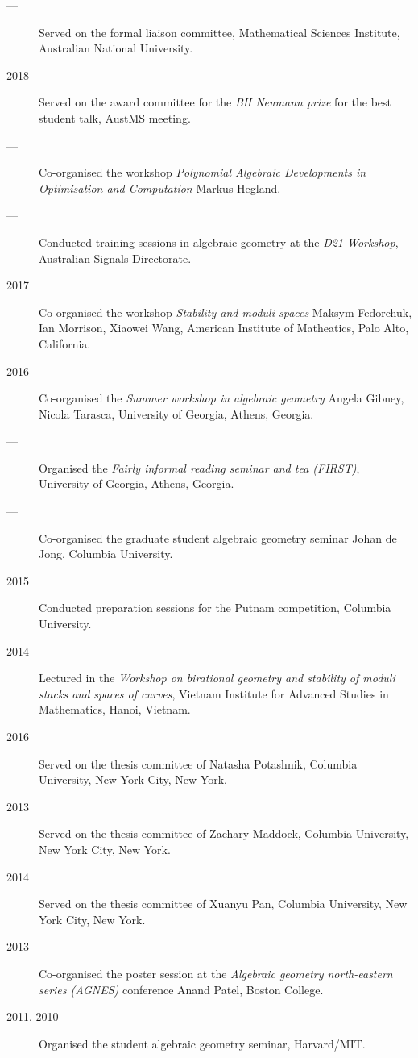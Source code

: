 \documentclass[11pt]{article}
\begin{document}
\begin{description}
\item[{---}] Served on the formal liaison committee, Mathematical Sciences Institute, Australian National University.
\item[{2018}] Served on the award committee for the \emph{BH Neumann prize} for the best student talk, AustMS meeting.
\item[{---}] Co-organised the workshop \emph{Polynomial Algebraic Developments in Optimisation and Computation} Markus Hegland.
\item[{---}] Conducted training sessions in algebraic geometry at the \emph{D21 Workshop}, Australian Signals Directorate.
\item[{2017}] Co-organised the workshop \emph{Stability and moduli spaces} Maksym Fedorchuk, Ian Morrison, Xiaowei Wang, American Institute of Matheatics, Palo Alto, California.
\item[{2016}] Co-organised the \emph{Summer workshop in algebraic geometry} Angela Gibney, Nicola Tarasca, University of Georgia, Athens, Georgia.
\item[{---}] Organised the \emph{Fairly informal reading seminar and tea (FIRST)}, University of Georgia, Athens, Georgia.
\item[{---}] Co-organised the graduate student algebraic geometry seminar Johan de Jong, Columbia University.
\item[{2015}] Conducted preparation sessions for the Putnam competition, Columbia University.
\item[{2014}] Lectured in the \emph{Workshop on birational geometry and stability of moduli stacks and spaces of curves}, Vietnam Institute for Advanced Studies in Mathematics, Hanoi, Vietnam.
\item[{2016}] Served on the thesis committee of Natasha Potashnik, Columbia University, New York City, New York.
\item[{2013}] Served on the thesis committee of Zachary Maddock, Columbia University, New York City, New York.
\item[{2014}] Served on the thesis committee of Xuanyu Pan, Columbia University, New York City, New York.
\item[{2013}] Co-organised the poster session at the \emph{Algebraic geometry north-eastern series (AGNES)} conference Anand Patel, Boston College.
\item[{2011, 2010}] Organised the student algebraic geometry seminar, Harvard/MIT.
\end{description}
\end{document}

